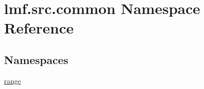 \hypertarget{namespacelmf_1_1src_1_1common}{\section{lmf.\+src.\+common Namespace Reference}
\label{namespacelmf_1_1src_1_1common}
}
\subsection*{Namespaces}
\begin{DoxyCompactItemize}
\item 
 \hyperlink{namespacelmf_1_1src_1_1common_1_1range}{range}
\end{DoxyCompactItemize}
